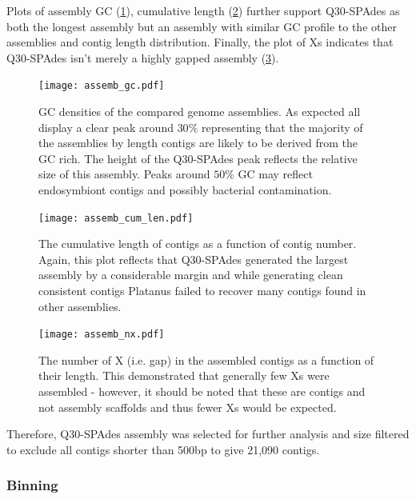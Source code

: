 Plots of assembly GC (\cref{fig:assemb_gc}), cumulative length (\cref{fig:assemb_len})
further support Q30-SPAdes as both the longest assembly
but an assembly with similar GC profile to the other assemblies and contig length distribution.
Finally, the plot of Xs indicates that Q30-SPAdes isn't merely a highly gapped
assembly (\cref{fig:assemb_nx}).

\begin{figure}
    \centering
    \texttt{[image: assemb\_gc.pdf]}
    \caption[Genome assembly GC densities]{GC densities of the compared genome assemblies.  As expected
        all display a clear peak around \(30\%\) representing that the majority
    of the assemblies by length contigs are likely to be derived from the GC rich.
The height of the Q30-SPAdes peak reflects the relative size of this assembly.
Peaks around \(50\%\) GC may reflect endosymbiont contigs and possibly
bacterial contamination.}
    \label{fig:assemb_gc}
\end{figure}

\begin{figure}
    \centering
    \texttt{[image: assemb\_cum\_len.pdf]}
    \caption[Genome Assembly Cumulative Contig Lengths]{The cumulative length of contigs as a function of
        contig number.  Again, this plot reflects
        that Q30-SPAdes generated the largest assembly
        by a considerable margin and while generating
        clean consistent contigs Platanus failed to recover
    many contigs found in other assemblies.}
    \label{fig:assemb_len}
\end{figure}

\begin{figure}
    \centering
    \texttt{[image: assemb\_nx.pdf]}
    \caption[Genome assembly gaps]{The number of X (i.e. gap) in the assembled contigs as a function of their
        length.  This demonstrated that generally few Xs were assembled - however, it should 
        be noted that these are contigs and not assembly scaffolds and thus fewer Xs
    would be expected.}
    \label{fig:assemb_nx}
\end{figure}

Therefore, Q30-SPAdes assembly was selected for further analysis
and size filtered to exclude all contigs shorter than 500bp 
to give 21,090 contigs. 

\subsubsection{Binning}

